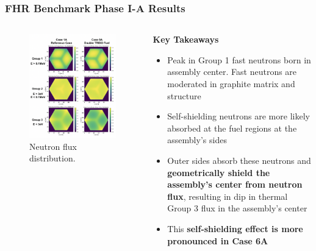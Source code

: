 \begin{frame}
    \frametitle{FHR Benchmark Phase I-A Results}
    \vspace{-0.4cm}
    \begin{columns}
        \begin{column}{0.5\textwidth}
            \begin{figure}
                \centering
                \includegraphics[width=\linewidth]{figures/phase1a-flux-vert.png} 
                \caption{Neutron flux distribution.}
            \end{figure}
        \end{column}
        \begin{column}{0.5\textwidth}
            \textbf{Key Takeaways} 
            \begin{itemize}
                \item Peak in Group 1 fast neutrons born in assembly center. Fast 
                neutrons are moderated in graphite matrix and structure 
                \item Self-shielding neutrons are more likely absorbed at the fuel 
                regions at the assembly's sides
                \item Outer sides absorb these neutrons and \textbf{geometrically 
                shield the assembly's center from neutron flux}, resulting in dip in 
                thermal Group 3 flux in the assembly's center
                \item This \textbf{self-shielding effect is more pronounced in Case 6A} 
            \end{itemize}
        \end{column}
    \end{columns}
\end{frame}

